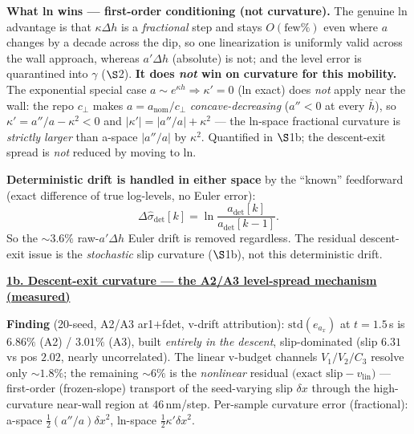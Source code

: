 \documentclass[11pt,a4paper,fontset=none]{ctexart}
\newcommand{\hd}[1]{\par\medskip\noindent\underline{\textbf{#1}}\par\nobreak\vspace{0.2ex}}
\begin{document}
\textbf{What ln wins --- first-order conditioning (not curvature).} The genuine ln advantage is that $\kappa\Delta h$ is a \emph{fractional} step and stays $O(\text{few}\%)$ even where $a$ changes by a decade across the dip, so one linearization is uniformly valid across the wall approach, whereas $a'\Delta h$ (absolute) is not; and the level error is quarantined into $\gamma$ ($\S$2). \textbf{It does \emph{not} win on curvature for this mobility.} The exponential special case $a\!\sim\!e^{\kappa h}\Rightarrow\kappa'=0$ (ln exact) does \emph{not} apply near the wall: the repo $c_\perp$ makes $a=a_{\mathrm{nom}}/c_\perp$ \emph{concave-decreasing} ($a''<0$ at every $\bar h$), so $\kappa'=a''/a-\kappa^2<0$ and $|\kappa'|=|a''/a|+\kappa^2$ --- the ln-space fractional curvature is \emph{strictly larger} than a-space $|a''/a|$ by $\kappa^2$. Quantified in $\S$1b; the descent-exit spread is \emph{not} reduced by moving to ln.

\textbf{Deterministic drift is handled in either space} by the ``known'' feedforward (exact difference of true log-levels, no Euler error):
\[ \Delta\hat\sigma_{\mathrm{det}}[k] = \ln\frac{a_{\mathrm{det}}[k]}{a_{\mathrm{det}}[k{-}1]}. \]
So the $\sim\!3.6\%$ raw-$a'\Delta h$ Euler drift is removed regardless. The residual descent-exit issue is the \emph{stochastic} slip curvature ($\S$1b), not this deterministic drift.

\hd{1b. Descent-exit curvature --- the A2/A3 level-spread mechanism (measured)}
\textbf{Finding} (20-seed, A2/A3 ar1$+$fdet, v-drift attribution): $\mathrm{std}(e_{a_x})$ at $t{=}1.5$\,s is $6.86\%$ (A2) / $3.01\%$ (A3), built \emph{entirely in the descent}, slip-dominated (slip $6.31$ vs pos $2.02$, nearly uncorrelated). The linear v-budget channels $V_1/V_2/C_3$ resolve only $\sim\!1.8\%$; the remaining $\sim\!6\%$ is the \emph{nonlinear} residual $\big(\text{exact slip}-v_{\mathrm{lin}}\big)$ --- first-order (frozen-slope) transport of the seed-varying slip $\delta x$ through the high-curvature near-wall region at $46$\,nm/step. Per-sample curvature error (fractional): a-space $\tfrac12(a''/a)\delta x^2$, ln-space $\tfrac12\kappa'\delta x^2$.
\end{document}
